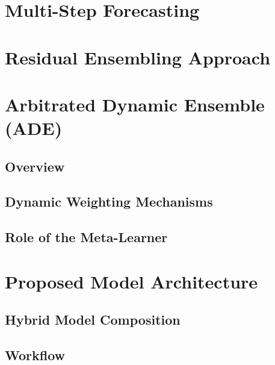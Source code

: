 \section{Multi-Step Forecasting}


\section{Residual Ensembling Approach}


\section{Arbitrated Dynamic Ensemble (ADE)}
\subsection{Overview} %
\subsection{Dynamic Weighting Mechanisms} %
\subsection{Role of the Meta-Learner} %


\section{Proposed Model Architecture} 
\subsection{Hybrid Model Composition} %
\subsection{Workflow} %


